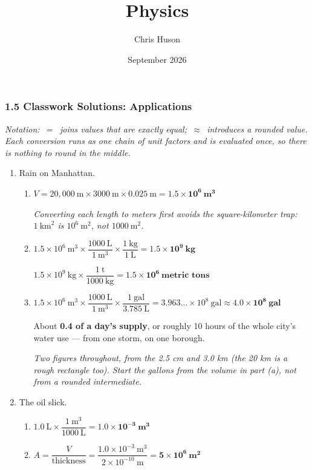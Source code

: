 \documentclass[12pt, twoside]{article}
\title{Physics}
\author{Chris Huson}
\date{September 2026}
\begin{document}
\subsubsection*{1.5 Classwork Solutions: Applications}

\emph{Notation: \,$=$\, joins values that are exactly equal; \,$\approx$\, introduces a
rounded value. Each conversion runs as one chain of unit factors and is evaluated once,
so there is nothing to round in the middle.}

\begin{enumerate}[itemsep=0.3cm]

\item Rain on Manhattan.
  \begin{enumerate}[itemsep=0.15cm]
    \item $V = 20{,}000~\text{m} \times 3000~\text{m} \times 0.025~\text{m}
      = \mathbf{1.5 \times 10^{6}~\textbf{m}^3}$

      \emph{Converting each length to meters first avoids the square-kilometer trap:
      $1~\text{km}^2$ is $10^{6}~\text{m}^2$, not $1000~\text{m}^2$.}
    \item $1.5 \times 10^{6}~\text{m}^3 \times \dfrac{1000~\text{L}}{1~\text{m}^3}
      \times \dfrac{1~\text{kg}}{1~\text{L}} = \mathbf{1.5 \times 10^{9}~\textbf{kg}}$

      $1.5 \times 10^{9}~\text{kg} \times \dfrac{1~\text{t}}{1000~\text{kg}}
      = \mathbf{1.5 \times 10^{6}~\textbf{metric tons}}$
    \item $1.5 \times 10^{6}~\text{m}^3 \times \dfrac{1000~\text{L}}{1~\text{m}^3}
      \times \dfrac{1~\text{gal}}{3.785~\text{L}} = 3.963\ldots \times 10^{8}~\text{gal}
      \approx \mathbf{4.0 \times 10^{8}~\textbf{gal}}$

      About \textbf{0.4 of a day's supply}, or roughly 10 hours of the whole city's
      water use --- from one storm, on one borough.

      \emph{Two figures throughout, from the 2.5 cm and 3.0 km (the 20 km is a rough
      rectangle too). Start the gallons from the volume in part (a), not from a rounded
      intermediate.}
  \end{enumerate}

\item The oil slick.
  \begin{enumerate}[itemsep=0.15cm]
    \item $1.0~\text{L} \times \dfrac{1~\text{m}^3}{1000~\text{L}}
      = \mathbf{1.0 \times 10^{-3}~\textbf{m}^3}$
    \item $A = \dfrac{V}{\text{thickness}}
      = \dfrac{1.0 \times 10^{-3}~\text{m}^3}{2 \times 10^{-10}~\text{m}}
      = \mathbf{5 \times 10^{6}~\textbf{m}^2}$


\end{enumerate}
\end{enumerate}
\end{document}
